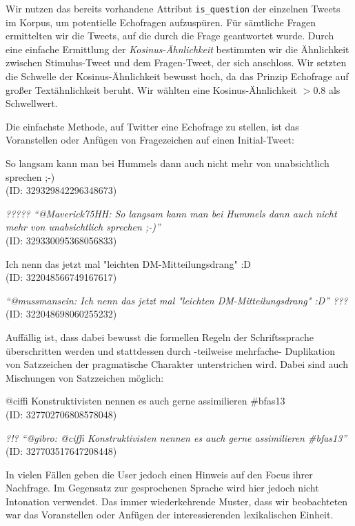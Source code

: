 \documentclass[main.tex]{subfiles}
\begin{document}
Wir nutzen das bereits vorhandene Attribut \texttt{is\_question} der einzelnen Tweets im Korpus, um potentielle Echofragen aufzuspüren. Für sämtliche Fragen ermittelten wir die Tweets, auf die durch die Frage geantwortet wurde. Durch eine einfache Ermittlung der \textit{Kosinus-Ähnlichkeit} bestimmten wir die Ähnlichkeit zwischen Stimulus-Tweet und dem Fragen-Tweet, der sich anschloss. Wir setzten die Schwelle der Kosinus-Ähnlichkeit bewusst hoch, da das Prinzip Echofrage auf großer Textähnlichkeit beruht. Wir wählten eine Kosinus-Ähnlichkeit  $> 0.8$ als Schwellwert.

Die einfachste Methode, auf Twitter eine Echofrage zu stellen, ist das Voranstellen oder Anfügen von Fragezeichen auf einen Initial-Tweet:

\begin{example}
So langsam kann man bei Hummels dann auch nicht mehr von unabsichtlich sprechen ;-)\\(ID: 329329842296348673)

\textit{????? “@Maverick75HH: So langsam kann man bei Hummels dann auch nicht mehr von unabsichtlich sprechen ;-)”} \\(ID: 329330095368056833)
\end{example}

\begin{example}
Ich nenn das jetzt mal "leichten DM-Mitteilungsdrang" :D \\(ID: 322048566749167617)

\textit{“@mussmansein: Ich nenn das jetzt mal "leichten DM-Mitteilungsdrang" :D” ???}\\ (ID: 322048698060255232)
\end{example}


Auffällig ist, dass dabei bewusst die formellen Regeln der Schriftssprache überschritten werden und stattdessen durch -teilweise mehrfache- Duplikation von Satzzeichen der pragmatische Charakter unterstrichen wird. Dabei sind auch Mischungen von Satzzeichen möglich:

\begin{example}
@ciffi Konstruktivisten nennen es auch gerne assimilieren \#bfas13 \\(ID: 327702706808578048)

\textit{?!? “@gibro: @ciffi Konstruktivisten nennen es auch gerne assimilieren \#bfas13”}\\(ID: 327703517647208448)
\end{example}

In vielen Fällen geben die User jedoch einen Hinweis auf den Focus ihrer Nachfrage. Im Gegensatz zur gesprochenen Sprache wird hier jedoch nicht Intonation verwendet. Das immer wiederkehrende Muster, dass wir beobachteten war das Voranstellen oder Anfügen der interessierenden lexikalischen Einheit.
\end{document}
